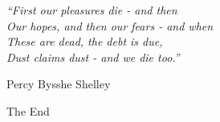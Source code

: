 \begin{center}
\textit{``First our pleasures die - and then}\\
\textit{Our hopes, and then our fears - and when}\\
\textit{These are dead, the debt is due,}\\
\textit{Dust claims dust - and we die too.''}
\end{center}
\hfil Percy Bysshe Shelley\\
\mbox{}
\vspace{\fill}
\begin{center}
    \LARGE The End
\end{center}
